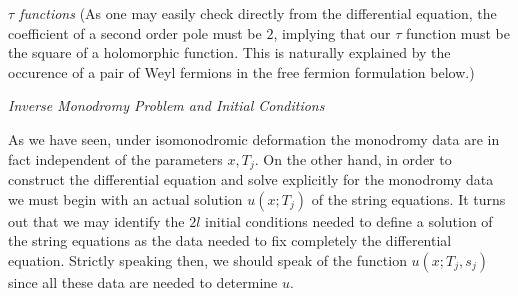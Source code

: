 \bigskip
{\it $\tau$ functions}
(As one may easily check directly from the 
differential equation, the coefficient of a second order pole 
must be $2$, implying that our $\tau$ function must be the 
square of a holomorphic function. This is naturally explained 
by the occurence of a pair of Weyl fermions in the free 
fermion formulation below.)

\bigskip
{\it Inverse Monodromy Problem and Initial Conditions}

As we have seen, under isomonodromic deformation 
the monodromy data are in fact independent of the 
parameters $x,T_j$. 
On the other hand, in order to construct 
the differential equation and solve explicitly for the 
monodromy data
we must begin with an actual solution 
$u(x;T_j)$ of the string equations. It turns out that
we may identify
the $2l$ initial conditions needed to define a solution of 
the string equations as the data needed to 
fix completely the differential equation.
Strictly speaking then, we should speak of the 
function $u(x;T_j,s_j)$ since all these data are needed to 
determine $u$. 

